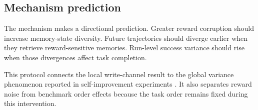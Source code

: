 \subsection{Mechanism prediction}
The mechanism makes a directional prediction. Greater reward corruption should increase memory-state diversity. Future trajectories should diverge earlier when they retrieve reward-sensitive memories. Run-level success variance should rise when those divergences affect task completion.

This protocol connects the local write-channel result to the global variance phenomenon reported in self-improvement experiments \citep{ye2026fragility}. It also separates reward noise from benchmark order effects because the task order remains fixed during this intervention.
